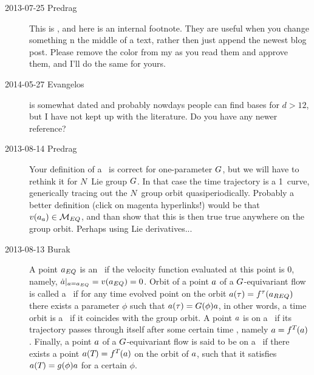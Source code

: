 \begin{description}

\item[2013-07-25  Predrag] This is ,
and here is an internal footnote. They
are useful when you change something n the middle of a text, rather then
just append the newest blog post. Please remove the color from my
 as you read them and approve them, and I'll do the same
for yours.


\item[2014-05-27 Evangelos]
 is
somewhat dated and probably nowdays people can find bases for $d>12$, but
I have not kept up with the literature. Do you have any newer
reference?

\item[2013-08-14  Predrag]
Your definition of a \reqv\ is correct for one-parameter $G$, but we
will have to rethink it for $N$\dmn\ Lie group $G$. In that case the
time trajectory is a 1\dmn\ curve, generically tracing out the $N$\dmn\
group orbit quasiperiodically. Probably a
 {better
definition} (click on magenta hyperlinks!) would be that
${v}({a_{a}}) \in {\cal M}_{EQ}$, and than show that this is then true
true anywhere on the group orbit. Perhaps using
 {Lie
derivatives}...

\item[2013-08-13 Burak]
                     \toCB
A point $a_{EQ}$ is an \eqv\ if the velocity function evaluated at this
point is 0, namely, $\dot{a}|_{a=a_{EQ}} = {v}({a_{EQ}}) = 0$.
Orbit of
a point $a$ of a $G$-equivariant flow is called a \reqv\ if for any
time evolved point on the orbit $a(\tau) = f^{\tau}(a_{REQ})$ there
exists a parameter $\phi$ such that $a(\tau) = G(\phi) a$, in other
words, a time orbit is a \reqv\ if it coincides with the group orbit.
 A
point $a$ is on a \po\ if its trajectory passes through itself after some
certain time \period{}, namely $a = f^{{T_{}}}(a)$. Finally, a point $a$ of a
$G$-equivariant flow is said to be on a \rpo\ if there exists a
point $a({T_{}}) = f^{T_{}}(a)$ on the orbit of $a$, such that it satisfies $a({T_{}}) =
g(\phi) a$ for a certain $\phi$.


\end{description}
